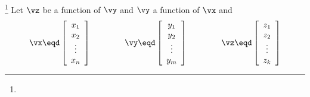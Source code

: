 \begin{theorem}
\label{thm:mc_chain_rule}
\footnote{
  }
Let $\vz$ be a function of $\vy$ and $\vy$ a function of $\vx$ and
\[
   \vx \eqd
   \left[\begin{array}{c}
     x_1    \\
     x_2    \\
     \vdots \\
     x_n
   \end{array}\right]
   \qquad\qquad
   \vy \eqd
   \left[\begin{array}{c}
     y_1    \\
     y_2    \\
     \vdots \\
     y_m
   \end{array}\right]
   \qquad\qquad
   \vz \eqd
   \left[\begin{array}{c}
     z_1    \\
     z_2    \\
     \vdots \\
     z_k
   \end{array}\right]
\]
\thmbox{
  \pderiv{}{\vx}\vz = \pderiv{\vy}{\vx} \pderiv{\vz}{\vy}
  }
\end{theorem}
